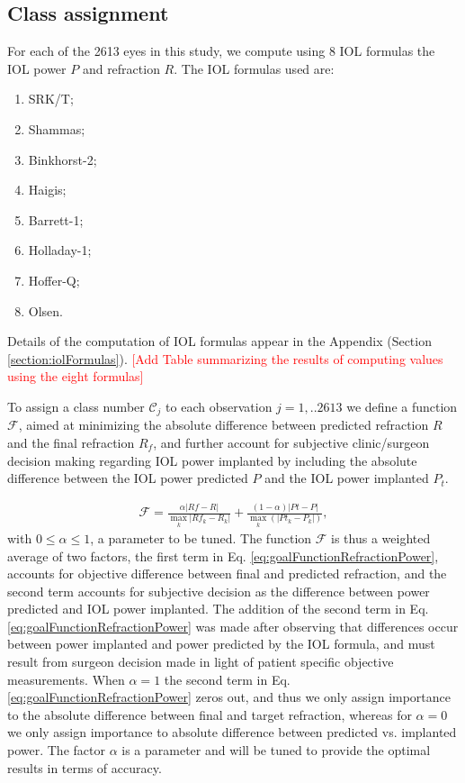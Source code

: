 \documentclass[article,twocolumn,preprint,10pt]{paper}%
\renewcommand{\(}{\left(}
\renewcommand{\)}{\right)}
\renewcommand{\[}{\left[}
\renewcommand{\]}{\right]}
\newcommand{\red}{\textcolor{red}}
\newcommand{\ds}{\displaystyle}
\newcommand{\beq}{\begin{eqnarray}}
\newcommand{\eeq}{\end{eqnarray}}
\newcommand{\1}{\mbox{\boldmath$1$}}
\begin{document}
\subsection{Class assignment}

For each of the 2613 eyes in this study, we compute using 8 IOL formulas the IOL power $P$ and refraction $R$. The IOL formulas used are:
\begin{enumerate}
	\item SRK/T;
	\item Shammas;
	\item Binkhorst-2;
	\item Haigis;
	\item Barrett-1;
	\item Holladay-1;
	\item Hoffer-Q;
	\item Olsen.
\end{enumerate} 
Details of the computation of IOL formulas appear in the Appendix (Section \ref{section:iolFormulas}). 
\red{[Add Table summarizing the results of computing values using the eight formulas]}

To assign a class number $\mathcal{C}_j$ to each observation $j=1,..2613$ we define a function $\mathcal{F}$, aimed at minimizing the absolute difference between predicted refraction $R$ and the final refraction $R_f$, and further account for subjective clinic/surgeon decision making regarding IOL power implanted by including the absolute difference between the IOL power predicted $P$ and the IOL power implanted $P_t$. 

\beq \label{eq:goalFunctionRefractionPower}
\mathcal{F} =   \frac{\alpha|Rf-R|}{\ds \max_k|Rf_k-R_k|}+\frac{(1-\alpha)|Pt-P|}{\ds \max_k(|Pt_k-P_k|)},
\eeq 
with $0\leq \alpha\leq 1$, a parameter to be tuned.
The function $\mathcal{F}$ is thus a weighted average of two factors, the first term in Eq. \ref{eq:goalFunctionRefractionPower}, accounts for objective difference between final and predicted refraction, and the second term accounts for subjective decision as the difference between power predicted and IOL power implanted. The addition of the second term in Eq. \ref{eq:goalFunctionRefractionPower} was made after observing that differences occur between power implanted and power predicted by the IOL formula, and must result from surgeon decision made in light of patient specific objective measurements.
When $\alpha=1$ the second term in Eq. \ref{eq:goalFunctionRefractionPower} zeros out, and thus we only assign importance to the absolute difference between final and target refraction, whereas for $\alpha=0$ we only assign importance to absolute difference between predicted vs. implanted power. The factor $\alpha$ is a parameter and will be tuned to provide the optimal results in terms of accuracy.
\end{document}

